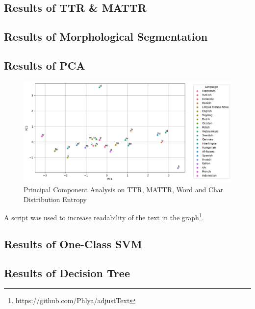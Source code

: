 \documentclass[12pt,a4paper]{article}
\numberwithin{figure}{section}
\numberwithin{table}{section}
\numberwithin{definition}{section}
\begin{document}
\subsection{Results of TTR \& MATTR}
\label{sec:ttrmattrresults}


\subsection{Results of Morphological Segmentation}
\label{sec:morphologicalsegmentationresults}

\subsection{Results of PCA}
\label{sec:pcaresults}

\begin{figure}
  \centering
        \includegraphics[width=1.0\textwidth]{pcaanalysis.png}
        \caption{Principal Component Analysis on TTR, MATTR, Word and Char Distribution Entropy}
        \label{fig:pcaanalysis}
\end{figure}


A script was used to increase readability of the text in the graph\footnote{https://github.com/Phlya/adjustText}.

\subsection{Results of One-Class SVM}
\label{sec:oneclasssvmresults}

\subsection{Results of Decision Tree}
\label{sec:decisiontreeresults}
\end{document}
